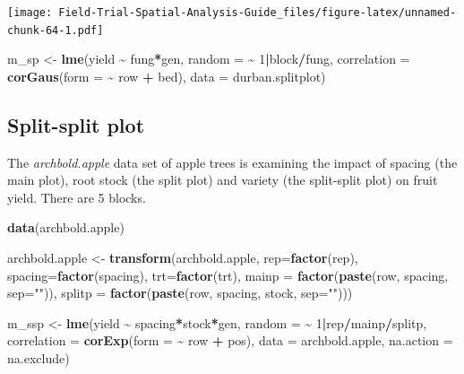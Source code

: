 \documentclass[
]{book}
\newenvironment{Shaded}{\begin{snugshade}}{\end{snugshade}}
\newcommand{\AttributeTok}[1]{\textcolor[rgb]{0.13,0.29,0.53}{#1}}
\newcommand{\DecValTok}[1]{\textcolor[rgb]{0.00,0.00,0.81}{#1}}
\newcommand{\FunctionTok}[1]{\textcolor[rgb]{0.13,0.29,0.53}{\textbf{#1}}}
\newcommand{\NormalTok}[1]{#1}
\newcommand{\OtherTok}[1]{\textcolor[rgb]{0.56,0.35,0.01}{#1}}
\newcommand{\SpecialCharTok}[1]{\textcolor[rgb]{0.81,0.36,0.00}{\textbf{#1}}}
\newcommand{\StringTok}[1]{\textcolor[rgb]{0.31,0.60,0.02}{#1}}
\begin{document}
\texttt{[image: Field-Trial-Spatial-Analysis-Guide\_files/figure-latex/unnamed-chunk-64-1.pdf]}

\begin{Shaded}
\begin{Highlighting}[]
\NormalTok{m\_sp }\OtherTok{\textless{}{-}} \FunctionTok{lme}\NormalTok{(yield }\SpecialCharTok{\textasciitilde{}}\NormalTok{ fung}\SpecialCharTok{*}\NormalTok{gen,}
            \AttributeTok{random =} \SpecialCharTok{\textasciitilde{}} \DecValTok{1}\SpecialCharTok{|}\NormalTok{block}\SpecialCharTok{/}\NormalTok{fung, }
            \AttributeTok{correlation =} \FunctionTok{corGaus}\NormalTok{(}\AttributeTok{form =} \SpecialCharTok{\textasciitilde{}}\NormalTok{ row }\SpecialCharTok{+}\NormalTok{ bed), }
            \AttributeTok{data =}\NormalTok{ durban.splitplot)}
\end{Highlighting}
\end{Shaded}

\hypertarget{split-split-plot}{%
\subsection{Split-split plot}\label{split-split-plot}}

The \emph{archbold.apple} data set of apple trees is examining the impact of spacing (the main plot), root stock (the split plot) and variety (the split-split plot) on fruit yield. There are 5 blocks.

\begin{Shaded}
\begin{Highlighting}[]
\FunctionTok{data}\NormalTok{(archbold.apple)}

\NormalTok{archbold.apple }\OtherTok{\textless{}{-}} \FunctionTok{transform}\NormalTok{(archbold.apple, }\AttributeTok{rep=}\FunctionTok{factor}\NormalTok{(rep), }\AttributeTok{spacing=}\FunctionTok{factor}\NormalTok{(spacing), }\AttributeTok{trt=}\FunctionTok{factor}\NormalTok{(trt),}
                 \AttributeTok{mainp =} \FunctionTok{factor}\NormalTok{(}\FunctionTok{paste}\NormalTok{(row, spacing, }\AttributeTok{sep=}\StringTok{""}\NormalTok{)),}
                 \AttributeTok{splitp =} \FunctionTok{factor}\NormalTok{(}\FunctionTok{paste}\NormalTok{(row, spacing, stock, }\AttributeTok{sep=}\StringTok{""}\NormalTok{)))}

\NormalTok{m\_ssp }\OtherTok{\textless{}{-}} \FunctionTok{lme}\NormalTok{(yield }\SpecialCharTok{\textasciitilde{}}\NormalTok{ spacing}\SpecialCharTok{*}\NormalTok{stock}\SpecialCharTok{*}\NormalTok{gen, }
             \AttributeTok{random =} \SpecialCharTok{\textasciitilde{}} \DecValTok{1}\SpecialCharTok{|}\NormalTok{rep}\SpecialCharTok{/}\NormalTok{mainp}\SpecialCharTok{/}\NormalTok{splitp, }
             \AttributeTok{correlation =} \FunctionTok{corExp}\NormalTok{(}\AttributeTok{form =} \SpecialCharTok{\textasciitilde{}}\NormalTok{ row }\SpecialCharTok{+}\NormalTok{ pos), }
             \AttributeTok{data =}\NormalTok{ archbold.apple, }\AttributeTok{na.action =}\NormalTok{ na.exclude)}
\end{Highlighting}
\end{Shaded}
\end{document}
